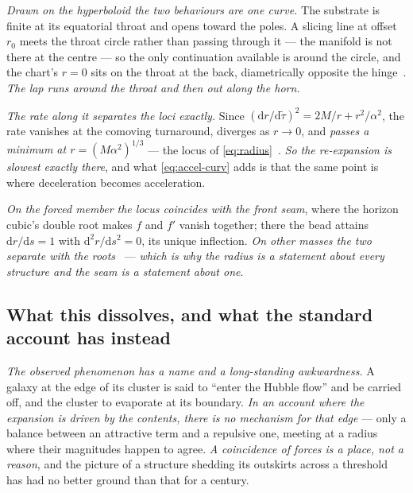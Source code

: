 \documentclass[11pt,a4paper]{article}
\newcommand{\dd}{\mathrm{d}}
\theoremstyle{plain}
\theoremstyle{definition}
\begin{document}
\emph{Drawn on the hyperboloid the two behaviours are one curve.} The substrate is finite at its equatorial
throat and opens toward the poles. A slicing line at offset $r_{0}$ meets the throat circle rather than
passing through it --- the manifold is not there at the centre --- so the only continuation available is
around the circle, and the chart's $r=0$ sits on the throat at the back, diametrically opposite the
hinge~\cite{JanzenSlicing}. \emph{The lap runs around the throat and then out along the horn.}

\emph{The rate along it separates the loci exactly.} Since $(\dd r/\dd\tilde\tau)^{2}=2M/r+r^{2}/\alpha^{2}$,
the rate vanishes at the comoving turnaround, diverges as $r\to0$, and \emph{passes a minimum at
$r=(M\alpha^{2})^{1/3}$} --- the locus of \eqref{eq:radius}~\cite{JanzenCRframework}. \emph{So the re-expansion
is slowest exactly there}, and what \eqref{eq:accel-curv} adds is that the same point is where deceleration
becomes acceleration.

\emph{On the forced member the locus coincides with the front seam}, where the horizon cubic's double root
makes $f$ and $f'$ vanish together; there the bead attains $\dd r/\dd s=1$ with $\dd^{2}r/\dd s^{2}=0$, its
unique inflection. \emph{On other masses the two separate with the roots}~\cite{JanzenCRframework,
JanzenSlicing} --- \emph{which is why the radius is a statement about every structure and the seam is a
statement about one}.

\subsection{What this dissolves, and what the standard account has instead}

\emph{The observed phenomenon has a name and a long-standing awkwardness.} A galaxy at the edge of its
cluster is said to ``enter the Hubble flow'' and be carried off, and the cluster to evaporate at its
boundary. \emph{In an account where the expansion is driven by the contents, there is no mechanism for that
edge} --- only a balance between an attractive term and a repulsive one, meeting at a radius where their
magnitudes happen to agree. \emph{A coincidence of forces is a place, not a reason}, and the picture of a
structure shedding its outskirts across a threshold has had no better ground than that for a century.
\end{document}
